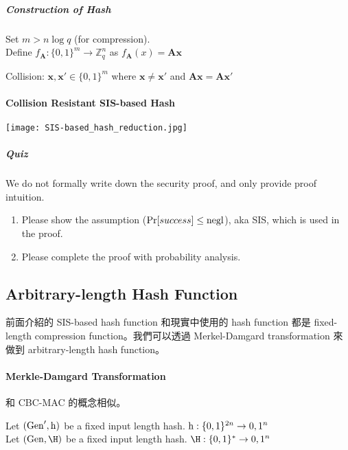 \subparagraph{Construction of Hash}

Set \(m > n \log q\) (for compression). \\
Define \(f_{\mathbf{A}}: \{0, 1\}^m \rightarrow \mathbb{Z}_q^n\) as \(f_{\mathbf{A}}(x) = \mathbf{Ax}\) 

Collision: \(\mathbf{x}, \mathbf{x'} \in \{0, 1\}^m\) where \(\mathbf{x} \neq \mathbf{x'}\) and \(\mathbf{Ax} = \mathbf{Ax'}\)


\paragraph{Collision Resistant SIS-based Hash}

\begin{center}
	\texttt{[image: SIS-based\_hash\_reduction.jpg]}
\end{center}

\subparagraph{Quiz}

We do not formally write down the security proof, and only provide proof intuition.
\begin{enumerate}[label=(\roman*)]
	\item Please show the assumption (\(\Pr[success] \leq \operatorname{negl}\)), aka SIS, which is used in the proof.
	\item Please complete the proof with probability analysis.
\end{enumerate}


\subsection{Arbitrary-length Hash Function}

前面介紹的 SIS-based hash function 和現實中使用的 hash function 都是 fixed-length compression function。我們可以透過 Merkel-Damgard transformation 來做到 arbitrary-length hash function。

\paragraph{Merkle-Damgard Transformation}

和 CBC-MAC 的概念相似。

Let \((\operatorname{Gen}', \operatorname{\mathrm{h}})\) be a fixed input length hash. \(\operatorname{\mathrm{h}}:\{0, 1\}^{2n} \rightarrow {0, 1}^n\) \\
Let \((\Gen, \H)\) be a fixed input length hash. \(\H:\{0, 1\}^\ast \rightarrow {0, 1}^n\)

